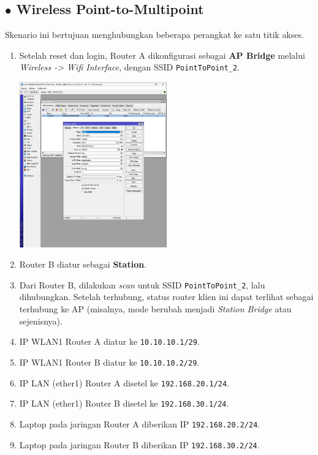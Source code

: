 \subsection*{$\bullet$ Wireless Point-to-Multipoint}
Skenario ini bertujuan menghubungkan beberapa perangkat ke satu titik akses.
\begin{enumerate}
    \item Setelah reset dan login, Router A dikonfigurasi sebagai \textbf{AP Bridge} melalui \textit{Wireless -> Wifi Interface}, dengan SSID \texttt{PointToPoint\_2}.
    \begin{center}
        \includegraphics[width=0.5\textwidth]{img/bridge.jpg} %
    \end{center}
    \item Router B diatur sebagai \textbf{Station}.
    \item Dari Router B, dilakukan \textit{scan} untuk SSID \texttt{PointToPoint\_2}, lalu dihubungkan. Setelah terhubung, status router klien ini dapat terlihat sebagai terhubung ke AP (misalnya, mode berubah menjadi \textit{Station Bridge} atau sejenisnya).
    \item IP WLAN1 Router A diatur ke \texttt{10.10.10.1/29}.
    \item IP WLAN1 Router B diatur ke \texttt{10.10.10.2/29}.
    \item IP LAN (ether1) Router A disetel ke \texttt{192.168.20.1/24}.
    \item IP LAN (ether1) Router B disetel ke \texttt{192.168.30.1/24}.
    \item Laptop pada jaringan Router A diberikan IP \texttt{192.168.20.2/24}.
    \item Laptop pada jaringan Router B diberikan IP \texttt{192.168.30.2/24}.

\end{enumerate}
